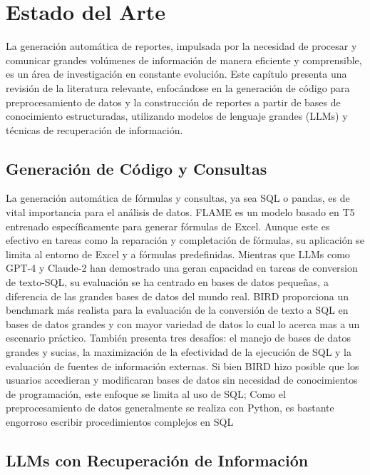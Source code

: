 \chapter{Estado del Arte}\label{chapter:state-of-the-art}

La generación automática de reportes, impulsada por la necesidad de procesar y comunicar grandes volúmenes de información de manera eficiente y comprensible, es un área de investigación en constante evolución. Este capítulo presenta una revisión de la literatura relevante, enfocándose en la generación de código para preprocesamiento de datos y la construcción de reportes a partir de bases de conocimiento estructuradas, utilizando modelos de lenguaje grandes (LLMs) y técnicas de recuperación de información.

\section{Generación de Código y Consultas}

La generación automática de fórmulas y consultas, ya sea SQL o pandas, es de vital importancia para el análisis de datos.  FLAME \cite{joshi2024flame} es un modelo basado en T5 entrenado específicamente para generar fórmulas de Excel. Aunque este es efectivo en tareas como la reparación y completación de fórmulas, su aplicación se limita al entorno de Excel y a fórmulas predefinidas. Mientras que LLMs como GPT-4 y Claude-2 han demostrado una geran capacidad en tareas de conversion de texto-SQL, su evaluación se ha centrado en bases de datos pequeñas, a diferencia de las grandes bases de datos del mundo real.
BIRD \cite{li2024can} proporciona un benchmark más realista para la evaluación de la conversión de texto a SQL en bases de datos grandes y con mayor variedad de datos lo cual lo acerca mas a un escenario práctico. También presenta tres desafíos: el manejo de bases de datos grandes y sucias, la maximización de la efectividad de la ejecución de SQL y la evaluación de fuentes de información externas. Si bien BIRD hizo posible que los usuarios accedieran y modificaran bases de datos sin necesidad de conocimientos de programación, este enfoque se limita al uso de SQL; Como el preprocesamiento de datos generalmente se realiza con Python, es bastante engorroso  escribir procedimientos complejos en SQL

\section{LLMs con Recuperación de Información}

